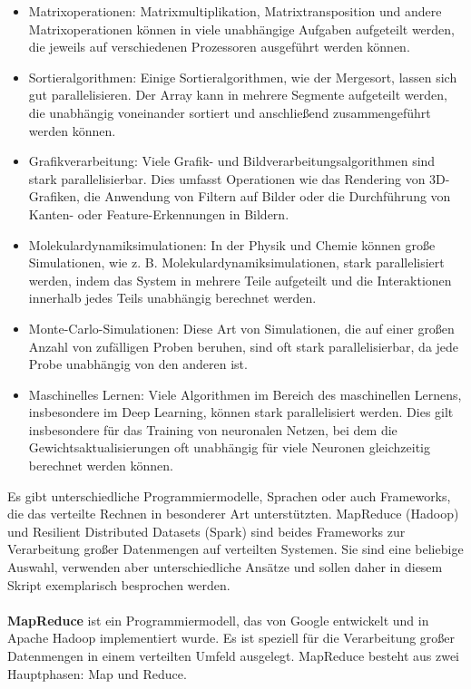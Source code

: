 \begin{itemize}
\item Matrixoperationen: Matrixmultiplikation, Matrixtransposition und andere Matrixoperationen können in viele unabhängige Aufgaben aufgeteilt werden, die jeweils auf verschiedenen Prozessoren ausgeführt werden können.
\item Sortieralgorithmen: Einige Sortieralgorithmen, wie der Mergesort, lassen sich gut parallelisieren. Der Array kann in mehrere Segmente aufgeteilt werden, die unabhängig voneinander sortiert und anschließend zusammengeführt werden können.
\item Grafikverarbeitung: Viele Grafik- und Bildverarbeitungsalgorithmen sind stark parallelisierbar. Dies umfasst Operationen wie das Rendering von 3D-Grafiken, die Anwendung von Filtern auf Bilder oder die Durchführung von Kanten- oder Feature-Erkennungen in Bildern.
\item Molekulardynamiksimulationen: In der Physik und Chemie können große Simulationen, wie z. B. Molekulardynamiksimulationen, stark parallelisiert werden, indem das System in mehrere Teile aufgeteilt und die Interaktionen innerhalb jedes Teils unabhängig berechnet werden.
\item Monte-Carlo-Simulationen: Diese Art von Simulationen, die auf einer großen Anzahl von zufälligen Proben beruhen, sind oft stark parallelisierbar, da jede Probe unabhängig von den anderen ist.
\item Maschinelles Lernen: Viele Algorithmen im Bereich des maschinellen Lernens, insbesondere im Deep Learning, können stark parallelisiert werden. Dies gilt insbesondere für das Training von neuronalen Netzen, bei dem die Gewichtsaktualisierungen oft unabhängig für viele Neuronen gleichzeitig berechnet werden können.
\end{itemize}
Es gibt unterschiedliche Programmiermodelle, Sprachen oder auch Frameworks, die das verteilte Rechnen in besonderer Art unterstützten. 
MapReduce (Hadoop) und Resilient Distributed Datasets (Spark) sind beides Frameworks zur Verarbeitung großer Datenmengen auf verteilten Systemen. Sie sind eine beliebige Auswahl, verwenden aber unterschiedliche Ansätze und sollen  daher in diesem Skript exemplarisch besprochen werden.
\\\\
\textbf{MapReduce} ist ein Programmiermodell, das von Google entwickelt und in Apache Hadoop implementiert wurde. Es ist speziell für die Verarbeitung großer Datenmengen in einem verteilten Umfeld ausgelegt. MapReduce besteht aus zwei Hauptphasen: Map und Reduce.
